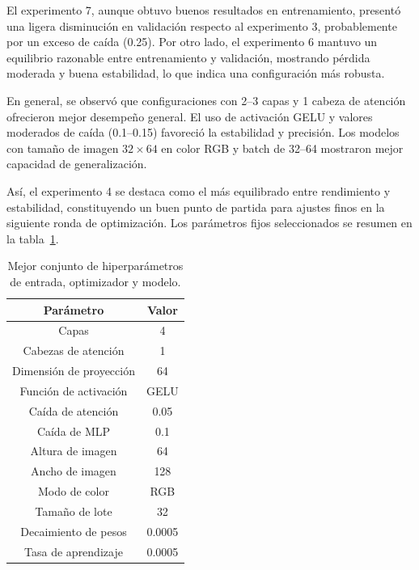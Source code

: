 El experimento 7, aunque obtuvo buenos resultados en entrenamiento,
presentó una ligera disminución en validación respecto al experimento 3, 
probablemente por un exceso de caída (0.25). Por otro lado,
el experimento 6 mantuvo un equilibrio razonable entre entrenamiento y validación,
mostrando pérdida moderada y buena estabilidad, lo que indica una configuración más robusta.

En general, se observó que configuraciones con 2–3 capas y 
1 cabeza de atención ofrecieron mejor desempeño general.
El uso de activación GELU y valores moderados de caída (0.1–0.15)
favoreció la estabilidad y precisión. Los modelos con tamaño de imagen $32\times 64$ en color RGB y
batch de 32–64 mostraron mejor capacidad de generalización.

Así, el experimento 4 se destaca como el más equilibrado entre rendimiento y estabilidad,
constituyendo un buen punto de partida para ajustes finos en la siguiente ronda de optimización.
Los parámetros fijos seleccionados se resumen en la tabla~\ref{tab:mejores-parametros-iniciales}.

\begin{table}[ht]
	\centering
	\begin{tabular}{cc}
		\toprule	
		\textbf{Parámetro} & \textbf{Valor} \\
		\midrule
		Capas & 4 \\
		Cabezas de atención & 1 \\
		Dimensión de proyección & 64 \\
		Función de activación & GELU \\
		Caída de atención & 0.05 \\
		Caída de MLP & 0.1 \\
		Altura de imagen & 64 \\
		Ancho de imagen & 128 \\
		Modo de color & RGB \\
		Tamaño de lote & 32 \\
		Decaimiento de pesos & 0.0005 \\
		Tasa de aprendizaje & 0.0005 \\
		\bottomrule
	\end{tabular}
	\caption{Mejor conjunto de hiperparámetros de entrada, optimizador y modelo.}
	\label{tab:mejores-parametros-iniciales}
\end{table}


